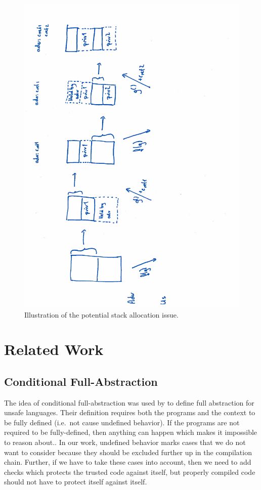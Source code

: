 \documentclass[a4paper]{article}
\begin{document}
\begin{figure}
  \centering
  \includegraphics[angle=270,trim={0 0 5cm 0},width=\textwidth]{img/stk-alloc.pdf}
  \caption{Illustration of the potential stack allocation issue.}
  \label{fig:stk-alloc}
\end{figure}



\section{Related Work}
\subsection{Conditional Full-Abstraction}
The idea of conditional full-abstraction was used by \citet{Juglaret2016} to define full abstraction for unsafe languages. Their definition requires both the programs and the context to be fully defined (i.e.\ not cause undefined behavior). If the programs are not required to be fully-defined, then anything can happen which makes it impossible to reason about.. In our work, undefined behavior marks cases that we do not want to consider because they should be excluded further up in the compilation chain. Further, if we have to take these cases into account, then we need to add checks which protects the trusted code against itself, but properly compiled code should not have to protect itself against itself.


\end{document}
